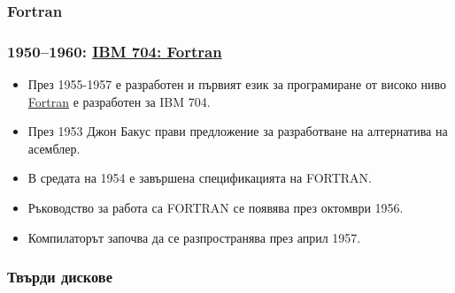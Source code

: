 \documentclass[ignorenonframetext, hyperref=unicode]{beamer}
\begin{document}
\subsubsection{Fortran}

\begin{frame}
\frametitle{1950--1960: \href{http://en.wikipedia.org/wiki/IBM_701}{IBM 704: Fortran}}
\begin{itemize}
\item През 1955-1957 е разработен и първият език за програмиране от високо ниво
\href{http://en.wikipedia.org/wiki/Fortran}{Fortran} е разработен за IBM 704.
\item През 1953 Джон Бакус прави предложение за разработване на алтернатива на
асемблер. 
\item В средата на 1954 е завършена спецификацията на FORTRAN.  
\item Ръководство за работа са FORTRAN се появява през октомври 1956.
\item Компилаторът започва да се разпространява през април 1957.
\end{itemize}
\end{frame}

\subsubsection{Твърди дискове}
\end{document}
